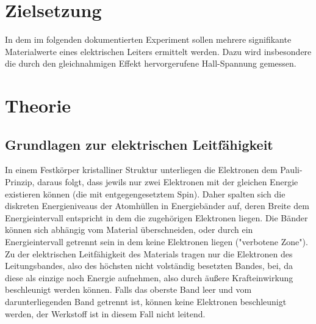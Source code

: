 \section{Zielsetzung}
In dem im folgenden dokumentierten Experiment sollen mehrere signifikante Materialwerte eines elektrischen Leiters ermittelt werden. Dazu wird insbesondere die durch den gleichnahmigen Effekt hervorgerufene Hall-Spannung gemessen.
\section{Theorie}
\subsection{Grundlagen zur elektrischen Leitfähigkeit}
In einem Festkörper kristalliner Struktur unterliegen die Elektronen dem Pauli-Prinzip, daraus folgt, dass jewils nur zwei Elektronen mit der gleichen Energie existieren können (die mit entgegengesetztem Spin). Daher spalten sich die diskreten Energieniveaus der Atomhüllen in Energiebänder auf, deren Breite dem Energieintervall entspricht in dem die zugehörigen Elektronen liegen. Die Bänder können sich abhängig vom Material überschneiden, oder durch ein Energieintervall getrennt sein in dem keine Elektronen liegen ("verbotene Zone"). Zu der elektrischen Leitfähigkeit des Materials tragen nur die Elektronen des Leitungsbandes, also des höchsten nicht volständig besetzten Bandes, bei, da diese als einzige noch Energie aufnehmen, also durch äußere Krafteinwirkung beschleunigt werden können. Falls das oberste Band leer und vom darunterliegenden Band getrennt ist, können keine Elektronen beschleunigt werden, der Werkstoff ist in diesem Fall nicht leitend.
